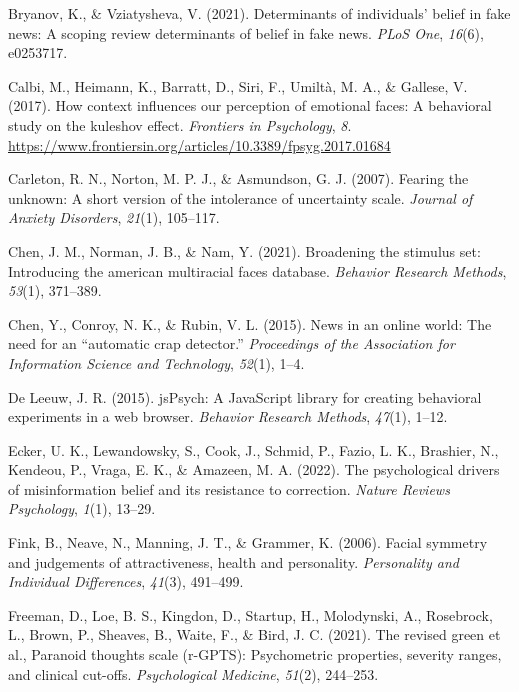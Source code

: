 \documentclass[
  man,floatsintext]{apa6}
\newlength{\cslhangindent}
\newlength{\cslentryspacingunit} %
\newenvironment{CSLReferences}[2] %
 {%
  \setlength{\parindent}{0pt}
  \ifodd #1
  \let\oldpar\par
  \def\par{\hangindent=\cslhangindent\oldpar}
  \fi
  \setlength{\parskip}{#2\cslentryspacingunit}
 }%
 {}
\begin{document}
\begin{CSLReferences}{1}{0}
\leavevmode{}%
Bryanov, K., \& Vziatysheva, V. (2021). Determinants of individuals' belief in fake news: A scoping review determinants of belief in fake news. \emph{PLoS One}, \emph{16}(6), e0253717.

\leavevmode{}%
Calbi, M., Heimann, K., Barratt, D., Siri, F., Umiltà, M. A., \& Gallese, V. (2017). How context influences our perception of emotional faces: A behavioral study on the kuleshov effect. \emph{Frontiers in Psychology}, \emph{8}. \url{https://www.frontiersin.org/articles/10.3389/fpsyg.2017.01684}

\leavevmode{}%
Carleton, R. N., Norton, M. P. J., \& Asmundson, G. J. (2007). Fearing the unknown: A short version of the intolerance of uncertainty scale. \emph{Journal of Anxiety Disorders}, \emph{21}(1), 105--117.

\leavevmode{}%
Chen, J. M., Norman, J. B., \& Nam, Y. (2021). Broadening the stimulus set: Introducing the american multiracial faces database. \emph{Behavior Research Methods}, \emph{53}(1), 371--389.

\leavevmode{}%
Chen, Y., Conroy, N. K., \& Rubin, V. L. (2015). News in an online world: The need for an {``automatic crap detector.''} \emph{Proceedings of the Association for Information Science and Technology}, \emph{52}(1), 1--4.

\leavevmode{}%
De Leeuw, J. R. (2015). jsPsych: A JavaScript library for creating behavioral experiments in a web browser. \emph{Behavior Research Methods}, \emph{47}(1), 1--12.

\leavevmode{}%
Ecker, U. K., Lewandowsky, S., Cook, J., Schmid, P., Fazio, L. K., Brashier, N., Kendeou, P., Vraga, E. K., \& Amazeen, M. A. (2022). The psychological drivers of misinformation belief and its resistance to correction. \emph{Nature Reviews Psychology}, \emph{1}(1), 13--29.

\leavevmode{}%
Fink, B., Neave, N., Manning, J. T., \& Grammer, K. (2006). Facial symmetry and judgements of attractiveness, health and personality. \emph{Personality and Individual Differences}, \emph{41}(3), 491--499.

\leavevmode{}%
Freeman, D., Loe, B. S., Kingdon, D., Startup, H., Molodynski, A., Rosebrock, L., Brown, P., Sheaves, B., Waite, F., \& Bird, J. C. (2021). The revised green et al., Paranoid thoughts scale (r-GPTS): Psychometric properties, severity ranges, and clinical cut-offs. \emph{Psychological Medicine}, \emph{51}(2), 244--253.


\end{CSLReferences}
\end{document}
